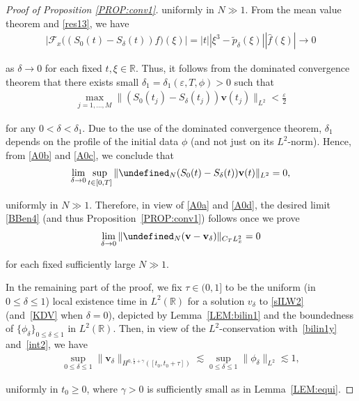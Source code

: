 \documentclass[letterpaper, 11pt,  reqno]{amsart}
\newcommand{\1}{\hspace{0.5mm}\textup{I}\hspace{0.5mm}}
\newcommand{\noi}{\noindent}
\newcommand{\R}{\mathbb{R}}
\let\P= \undefined
\newcommand{\P}{\mathbf{P}}
\newcommand{\dl}{\delta}
\newcommand{\eps}{\varepsilon}
\newcommand{\g}{\gamma}
\newcommand{\ft}{\widehat}
\newcommand{\Ft}{{\mathcal{F}}}
\newcommand{\wt}{\widetilde}
\newcommand{\les}{\lesssim}
\newcommand{\vv}{\mathbf{v}}
\newcommand{\too}{\longrightarrow}
\numberwithin{equation}{section}
\numberwithin{theorem}{section}
\begin{document}
\begin{proof}[Proof of Proposition \ref{PROP:conv1}]
\noi
uniformly in $N \gg1 $.
From  the mean value theorem
and \eqref{res13}, we have
\begin{align*}
\big| \Ft_x\big( (S_0(t) -  S_\dl(t) ) f \big) (\xi) \big|
= 
|t|  |\xi^3 - \wt p_\dl(\xi) |
|\ft f(\xi)|
\too 0 
\end{align*}


\noi
as $\dl\to0$
for each fixed $t, \xi \in \R$.
Thus, it follows from 
the dominated convergence theorem
that there exists small $\dl_1  = \dl_1(\eps, T, \phi)> 0$ such that 
\begin{align}
\max_{j = 1, \dots, M}\| (S_0(t_j) - S_\dl(t_j) )  \vv(t_j) \|_{L^2} 
< \frac \eps 2
\label{A0c}
\end{align}

\noi
for any $0 < \dl < \dl_1$.
Due to the use of the dominated convergence theorem, 
$\dl_1$ depends on the profile of the initial data $\phi$
(and not just on its $L^2$-norm).
Hence, from \eqref{A0b} and \eqref{A0c}, 
we conclude that 
\begin{align}
\lim_{\dl \to 0}
\sup_{t \in [0, T]}
\| \P_N (S_0(t) - S_\dl(t))\vv(t)\|_{L^2} = 0, 
\label{A0d}
\end{align}


\noi
uniformly in $N \gg1 $.
Therefore, 
in view of \eqref{A0a} and \eqref{A0d}, 
the desired limit \eqref{BBen4} (and thus Proposition~\ref{PROP:conv1}) follows once we prove 
\begin{align}
\lim_{\dl \to 0}\|\P_N(\vv - \vv_\dl)\|_{C_{T}L^2_x}= 0
\label{XX1}
\end{align}

\noi
for each fixed sufficiently large $N\gg1$.



In the remaining part of the proof, 
we fix
 $\tau \in (0, 1]$
to be  the uniform (in $0 \le \dl \le 1$)  local existence time
in $L^2(\R)$
for a solution $v_\dl$ to \eqref{sILW2}
(and~\eqref{KDV} when $\dl = 0$), 
depicted by Lemma~\ref{LEM:bilin1}
and the boundedness of $\{\phi_\dl\}_{0 \le \dl \le 1}$ in $L^2(\R)$.
Then, in view of the $L^2$-conservation
with~\eqref{bilin1y}
and~\eqref{int2}, 
we have 
\begin{align}
\sup_{0 \le \dl\le 1} \|\vv_\dl\|_{H^{0, \frac 12 + \g}([t_0, t_0 + \tau])} 
\les \sup_{0 \le \dl\le 1} \|\phi_\dl\|_{L^2}\les 1, 
\label{IC0c}
\end{align}

\noi
uniformly in  $t_0 \ge 0$, 
where
 $\g > 0$ is sufficiently small as in Lemma~\ref{LEM:equi}.



\end{proof}
\end{document}

